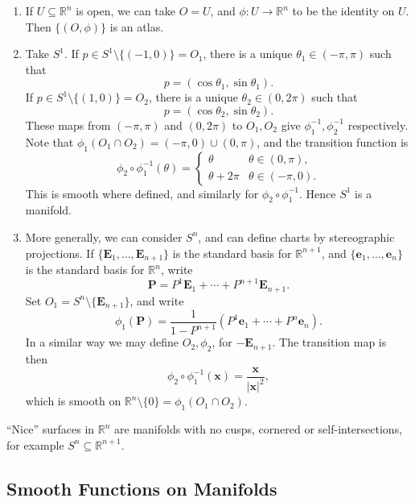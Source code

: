 \documentclass[12pt]{article}
\begin{document}
\begin{exbox}
	\begin{enumerate}
		\item If $U \subseteq \mathbb{R}^n$ is open, we can take $O = U$, and $\phi : U \to \mathbb{R}^n$ to be the identity on $U$. Then $\{(O, \phi)\}$ is an atlas.
		\item Take $S^1$. If $p \in S^1 \setminus \{(-1, 0)\} = O_1$, there is a unique $\theta_1 \in (-\pi, \pi)$ such that
			\[
			p = (\cos \theta_1, \sin \theta_1).
			\]
			If $p \in S^1 \setminus \{(1, 0)\} = O_2$, there is a unique $\theta_2 \in (0, 2\pi)$ such that
			\[
			p = (\cos \theta_2, \sin \theta_2).
			\]
			These maps from $(-\pi, \pi)$ and $(0, 2\pi)$ to $O_1, O_2$ give $\phi_1^{-1}, \phi_2^{-1}$ respectively. Note that $\phi_1(O_1 \cap O_2) = (-\pi, 0) \cup (0, \pi)$, and the transition function is
			\[
			\phi_2 \circ \phi_1^{-1} (\theta) = 
			\begin{cases}
				\theta & \theta \in (0, \pi), \\
				\theta + 2 \pi & \theta \in (-\pi, 0).
			\end{cases}
			\]
			This is smooth where defined, and similarly for $\phi_2 \circ \phi_1^{-1}$. Hence $S^1$ is a manifold.
		\item More generally, we can consider $S^n$, and can define charts by stereographic projections. If $\{\mathbf{E}_1, \ldots, \mathbf{E}_{n+1}\}$ is the standard basis for $\mathbb{R}^{n+1}$, and $\{\mathbf{e}_1, \ldots, \mathbf{e}_n\}$ is the standard basis for $\mathbb{R}^n$, write
			\[
			\mathbf{P} = P^1 \mathbf{E}_1 + \cdots + P^{n+1} \mathbf{E}_{n+1}.
			\]
			Set $O_1 = S^n \setminus \{\mathbf{E}_{n+1}\}$, and write
			\[
			\phi_1(\mathbf{P}) = \frac{1}{1 - P^{n+1}}(P^1 \mathbf{e}_1 + \cdots + P^n \mathbf{e}_n).
			\]
			In a similar way we may define $O_2, \phi_2$, for $-\mathbf{E}_{n+1}$. The transition map is then
			\[
			\phi_2 \circ \phi_1^{-1}(\mathbf{x}) = \frac{\mathbf{x}}{|\mathbf{x}|^2},
			\]
			which is smooth on $\mathbb{R}^n \setminus \{0\} = \phi_1 (O_1 \cap O_2)$.
	\end{enumerate}
\end{exbox}


``Nice'' surfaces in $\mathbb{R}^n$ are manifolds with no cusps, cornered or self-intersections, for example $S^n \subseteq \mathbb{R}^{n+1}$.

\subsection{Smooth Functions on Manifolds}%
\label{sub:smooth_fn}
\end{document}
